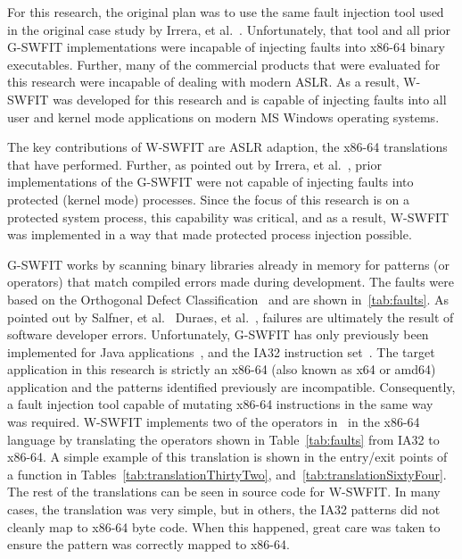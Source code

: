 For this research, the original plan was to use the same fault injection tool
used in the original case study by Irrera, et al.~\cite{irrera2015}.
Unfortunately, that tool and all prior \ac{G-SWFIT} implementations were
incapable of injecting faults into x86-64 binary executables.  Further, many of
the commercial products that were evaluated for this research were incapable of
dealing with modern \ac{ASLR}.  As a result, \ac{W-SWFIT} was developed for
this research and is capable of injecting faults into all user and kernel mode
applications on modern \ac{MS} Windows operating systems.  

The key contributions of \ac{W-SWFIT} are \ac{ASLR} adaption, the x86-64
translations that have performed.  Further, as pointed out by Irrera, et
al.~\cite{irrera2013a}, prior implementations of the \ac{G-SWFIT} were not
capable of injecting faults into protected (kernel mode) processes.  Since the
focus of this research is on a protected system process, this capability was
critical, and as a result, \ac{W-SWFIT} was implemented in a way that made
protected process injection possible.  

\ac{G-SWFIT} works by scanning binary libraries already in memory for patterns
(or operators) that match compiled errors made during development.  The faults
were based on the Orthogonal Defect Classification~\cite{bridge1998} and are
shown in~\ref{tab:faults}.  As pointed out by Salfner, et
al.~\cite{salfnerSurvey} Duraes, et al.~\cite{gswfit}, failures are ultimately
the result of software developer errors.  Unfortunately, \ac{G-SWFIT} has only
previously been implemented for Java
applications~\cite{sanches2011jswfit,martins2002jaca}, and the IA32 instruction
set~\cite{gswfit}.  The target application in this research is strictly an
x86-64 (also known as x64 or amd64) application and the patterns identified
previously are incompatible.  Consequently, a fault injection tool capable of
mutating x86-64 instructions in the same way was required.  \ac{W-SWFIT}
implements two of the operators in~\cite{gswfit} in the x86-64 language by
translating the operators shown in Table~\ref{tab:faults} from IA32 to x86-64.
A simple example of this translation is shown in the entry/exit points of a
function in Tables~\ref{tab:translationThirtyTwo},
and~\ref{tab:translationSixtyFour}.  The rest of the translations can be seen
in source code for \ac{W-SWFIT}.  In many cases, the translation was very
simple, but in others, the IA32 patterns did not cleanly map to x86-64 byte
code.  When this happened, great care was taken to ensure the pattern was
correctly mapped to x86-64.

